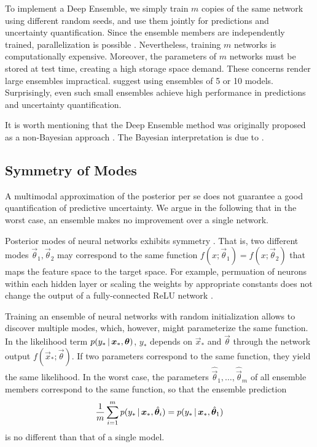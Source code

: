 To implement a Deep Ensemble, we simply train $m$ copies of the same network using different random seeds, and use them jointly for predictions and uncertainty quantification. Since the ensemble members are independently trained, parallelization is possible \citep{lakshminarayananSimpleScalablePredictive2017b}. Nevertheless, training $m$ networks is computationally expensive. Moreover, the parameters of $m$ networks must be stored at test time, creating a high storage space demand. These concerns render large ensembles impractical. \cite{lakshminarayananSimpleScalablePredictive2017b} suggest using ensembles of 5 or 10 models. Surprisingly, even such small ensembles achieve high performance in predictions and uncertainty quantification.

It is worth mentioning that the Deep Ensemble method was originally proposed as a non-Bayesian approach \citep{lakshminarayananSimpleScalablePredictive2017b}. The Bayesian interpretation is due to \cite{wilsonBayesianDeepLearning2020}.

\subsection{Symmetry of Modes}

A multimodal approximation of the posterior per se does not guarantee a good quantification of predictive uncertainty. We argue in the following that in the worst case, an ensemble makes no improvement over a single network.

Posterior modes of neural networks exhibits symmetry \citep{sommerConnectingDotsModeConnectedness2024b}. That is, two different modes $\vec{\theta}_1, \vec{\theta}_2$ may correspond to the same function $f(x; \vec{\theta}_1) = f(x; \vec{\theta}_2)$ that maps the feature space to the target space. For example, permuation of neurons within each hidden layer or scaling the weights by appropriate constants does not change the output of a fully-connected ReLU network \citep{grigsbyHiddenSymmetriesReLU2023}. 

Training an ensemble of neural networks with random initialization allows to discover multiple modes, which, however, might parameterize the same function. In the likelihood term $p(y_* \,|\, \bm{x}_*, \bm{\theta})$, $y_*$ depends on $\vec{x}_*$ and $\vec{\theta}$ through the network output $f(\vec{x}_*; \vec{\theta})$. If two parameters correspond to the same function, they yield the same likelihood. In the worst case, the parameters $\hat{\vec{\theta}}_1, \dots, \hat{\vec{\theta}}_m$ of all ensemble members correspond to the same function, so that the ensemble prediction
\begin{equation*}
  \frac{1}{m} \sum_{i=1}^{m} p(y_* \,|\, \bm{x}_*, \hat{\bm{\theta}}_i) = p(y_* \,|\, \bm{x}_*, \hat{\bm{\theta}}_1)
\end{equation*}
is no different than that of a single model.

